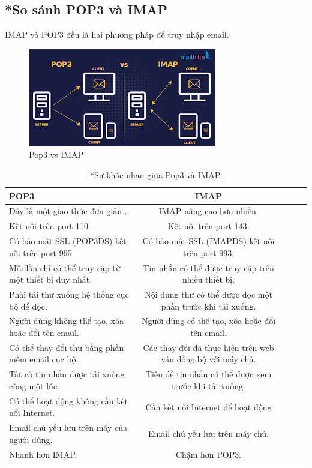 \documentclass[APA,STIX1COL]{WileyNJD-v2}
\begin{document}
\subsection*{*So sánh POP3 và IMAP}
IMAP và POP3 đều là hai phương pháp để truy nhập email.
\begin{figure}[h]
  \centering
  \includegraphics[scale=1]{imapvspop3.png}
  \caption{Pop3 vs IMAP}
  \label{fig:imapvpop3}
\end{figure}

\begin{center}
  \begin{table}[h]%
  \centering
  \caption{*Sự khác nhau giữa Pop3 và IMAP.\label{tab2}}%
  \begin{tabular*}{500pt}{@{\extracolsep\fill}lcccc@{\extracolsep\fill}}
  \toprule
  \textbf{POP3}  & \textbf{IMAP} \\
  \midrule
  Đây là một giao thức đơn giản . & IMAP nâng cao hơn nhiều. \\
  Kết nối trên port 110 . & Kết nối trên port 143. \\
  Có bảo mật SSL (POP3DS) kết nối trên port 995 & Có bảo mật SSL (IMAPDS) kết nối trên port 993. \\
  Mỗi lần chỉ có thể truy cập từ một thiết bị duy nhất. & Tin nhắn có thể được truy cập trên nhiều thiết bị. \\
  Phải tải thư xuống hệ thống cục bộ để đọc. & Nội dung thư có thể được đọc một phần trước khi tải xuống. \\
  Người dùng không thể tạo, xóa hoặc đổi tên email. & Người dùng có thể tạo, xóa hoặc đổi tên email. \\
  Có thể thay đổi thư bằng phần mềm email cục bộ. & Các thay đổi đã thực hiện trên web vẫn đồng bộ với máy chủ. \\
  Tất cả tin nhắn được tải xuống cùng một lúc. & Tiêu đề tin nhắn có thể được xem trước khi tải xuống. \\
  Có thể hoạt động không cần kết nối Internet. & Cần kết nối Internet để hoạt động \\
  Email chủ yếu lưu trên máy của người dùng. & Email chủ yếu lưu trên máy chủ. \\
  Nhanh hơn IMAP. & Chậm hơn POP3. \\
  \bottomrule
  \end{tabular*}

  \end{table}
  \end{center}
\end{document}
